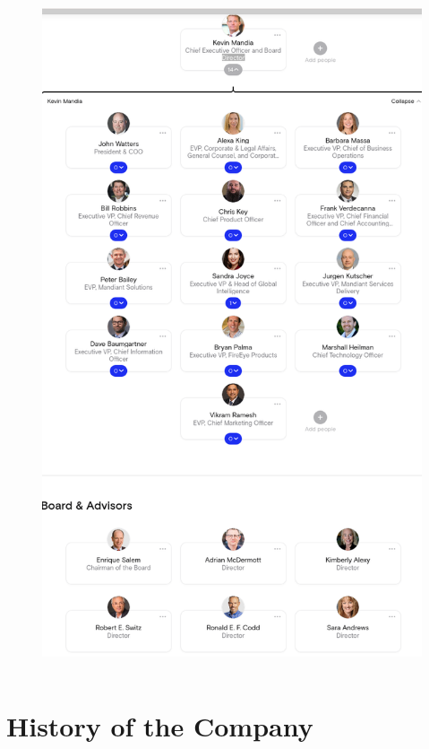 \documentclass{beamer}
\begin{document}
\begin{frame}
\begin{columns}
\begin{figure}
				\includegraphics[scale=0.15]{org.png}
			\end{figure}
		\end{columns}
	\end{frame}
	\section{History of the Company}
\end{document}
